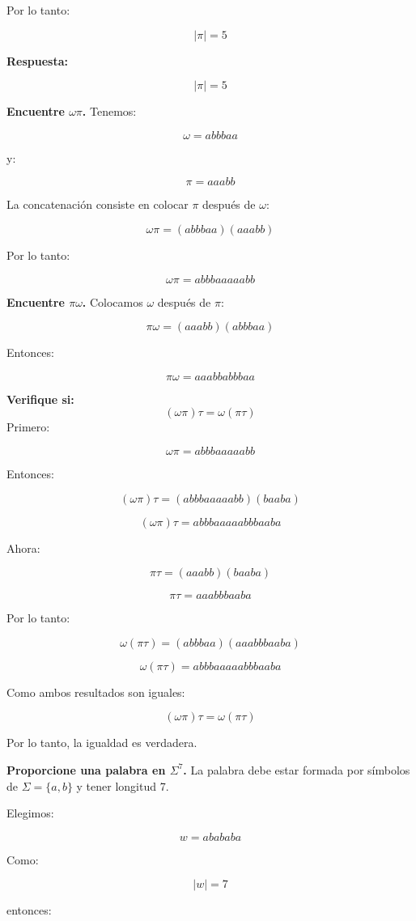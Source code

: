 \documentclass[12pt]{article}
\begin{document}
Por lo tanto:

\[
|\pi|=5
\]

\textbf{Respuesta:}

\[
\boxed{|\pi|=5}
\]


\textbf{Encuentre $\omega\pi$.}
Tenemos:

\[
\omega=abbbaa
\]

y:

\[
\pi=aaabb
\]

La concatenación consiste en colocar $\pi$ después de $\omega$:

\[
\omega\pi=(abbbaa)(aaabb)
\]

Por lo tanto:

\[
\boxed{\omega\pi=abbbaaaaabb}
\]

\textbf{Encuentre $\pi\omega$.}
Colocamos $\omega$ después de $\pi$:

\[
\pi\omega=(aaabb)(abbbaa)
\]

Entonces:

\[
\boxed{\pi\omega=aaabbabbbaa}
\]

\textbf{Verifique si: \[ (\omega\pi)\tau=\omega(\pi\tau)\]}
Primero:

\[
\omega\pi=abbbaaaaabb
\]

Entonces:

\[
(\omega\pi)\tau
=(abbbaaaaabb)(baaba)
\]

\[
(\omega\pi)\tau=abbbaaaaabbbaaba
\]

Ahora:

\[
\pi\tau=(aaabb)(baaba)
\]

\[
\pi\tau=aaabbbaaba
\]

Por lo tanto:

\[
\omega(\pi\tau)
=(abbbaa)(aaabbbaaba)
\]

\[
\omega(\pi\tau)=abbbaaaaabbbaaba
\]

Como ambos resultados son iguales:

\[
\boxed{(\omega\pi)\tau=\omega(\pi\tau)}
\]

Por lo tanto, la igualdad es verdadera.



\textbf{Proporcione una palabra en $\Sigma^7$.}
La palabra debe estar formada por símbolos de $\Sigma=\{a,b\}$
y tener longitud 7.

Elegimos:

\[
w=abababa
\]

Como:

\[
|w|=7
\]

entonces:
\end{document}
